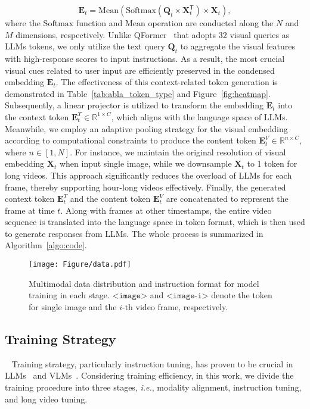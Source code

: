 \begin{equation}\label{equ:context_att}
{\mathbf E}_t = {\mathrm {Mean}}({\mathrm {Softmax}}({\mathbf Q}_t \times {\mathbf X}^{\mathsf{T}}_t) \times {\mathbf X}_t),
\end{equation}
where the $\mathrm {Softmax}$ function and $\mathrm {Mean}$ operation are conducted along the $N$ and $M$ dimensions, respectively.
Unlike QFormer~\cite{instructblip} that adopts 32 visual queries as LLMs tokens, we only utilize the text query ${\mathbf Q}_t$ to aggregate the visual features with high-response scores to input instructions.
As a result, the most crucial visual cues related to user input are efficiently preserved in the condensed embedding ${\mathbf E}_t$. 
The effectiveness of this context-related token generation is demonstrated in Table~\ref{tab:abla_token_type} and Figure~\ref{fig:heatmap}.
Subsequently, a linear projector is utilized to transform the embedding ${\mathbf E}_t$ into the context token ${\mathbf E}^{T}_t \in\mathbb{R}^{1\times C}$, which aligns with the language space of LLMs. 
Meanwhile, we employ an adaptive pooling strategy for the visual embedding according to computational constraints to produce the content token ${\mathbf E}^{V}_t \in\mathbb{R}^{n\times C}$, where $n\in[1,N]$.
For instance, we maintain the original resolution of visual embedding ${\mathbf X}_t$ when input single image, while we downsample ${\mathbf X}_t$ to 1 token for long videos. 
This approach significantly reduces the overload of LLMs for each frame, thereby supporting hour-long videos effectively.
Finally, the generated context token ${\mathbf E}^{T}_t$ and the content token ${\mathbf E}^{V}_t$ are concatenated to represent the frame at time $t$. Along with frames at other timestamps, the entire video sequence is translated into the language space in token format, which is then used to generate responses from LLMs. 
The whole process is summarized in Algorithm~\ref{algo:code}.

\begin{figure}[t!]
\centering
\texttt{[image: Figure/data.pdf]} 
\caption{
Multimodal data distribution and instruction format for model training in each stage.
$\texttt{<image>}$ and $\texttt{<image-i>}$ denote the token for single image and the $i$-th video frame, respectively.
}
\label{fig:data}
\end{figure}

\subsection{Training Strategy}~\label{sec:sub_train}
Training strategy, particularly instruction tuning, has proven to be crucial in LLMs~\cite{llama,alpaca,vicuna} and VLMs~\cite{instructblip,llava,llava1.5}.
Considering training efficiency, in this work, we divide the training procedure into three stages, {\em i.e.}, modality alignment, instruction tuning, and long video tuning.

